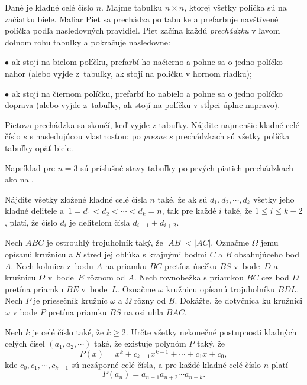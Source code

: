 {%
Dané je kladné celé číslo $n$. Majme tabuľku $n \times n$, ktorej všetky políčka sú na začiatku biele. Maliar Piet sa prechádza po tabuľke a prefarbuje navštívené políčka podľa nasledovných pravidiel. Piet začína každú \emph{prechádzku} v ľavom dolnom rohu tabuľky a pokračuje nasledovne:
\item{$\bullet$} ak stojí na bielom políčku, prefarbí ho načierno a pohne sa o jedno políčko nahor (alebo vyjde z~tabuľky, ak stojí na políčku v hornom riadku);
\item{$\bullet$} ak stojí na čiernom políčku, prefarbí ho nabielo a pohne sa o jedno políčko doprava (alebo vyjde z~tabuľky, ak stojí na políčku v stĺpci úplne napravo).

Pietova prechádzka sa skončí, keď vyjde z tabuľky. Nájdite najmenšie kladné celé číslo $s$ s nasledujúcou vlastnosťou: po \emph{presne} $s$ prechádzkach sú všetky políčka tabuľky opäť biele.

\smallskip\noindent
Napríklad pre $n = 3$ sú príslušné stavy tabuľky po prvých piatich prechádzkach ako na \obr.
%
}

{%
Nájdite všetky zložené kladné celé čísla $n$ také,
že ak sú $d_1, d_2, \cdots, d_k$ všetky jeho kladné delitele
a~$1=d_1<d_2<\cdots<d_k=n$,
tak pre každé $i$ také,
že $1\le i\le k-2$,
platí,
že číslo $d_i$ je deliteľom čísla $d_{i+1}+d_{i+2}$.
}

{%
Nech $ABC$ je ostrouhlý trojuholník taký,
že $|AB|<|AC|$.
Označme $\varOmega$ jemu opísanú kružnicu
a $S$ stred jej oblúka s krajnými bodmi $C$ a $B$ obsahujúceho bod $A$.
Nech kolmica z~bodu $A$ na priamku $BC$ pretína úsečku $BS$ v~bode~$D$
a kružnicu $\varOmega$ v~bode~$E$ rôznom od $A$.
Nech rovnobežka s priamkou $BC$ cez bod $D$ pretína priamku $BE$ v~bode~$L$.
Označme $\omega$ kružnicu opísanú trojuholníku $BDL$.
Nech $P$ je priesečník kružníc $\omega$ a $\varOmega$ rôzny od $B$.
Dokážte,
že dotyčnica ku kružnici $\omega$ v bode $P$ pretína priamku $BS$ na osi uhla $BAC$.
}

{%
Nech $k$ je celé číslo také, že $k\ge2$. Určte všetky nekonečné postupnosti kladných celých čísel $(a_1,a_2,\cdots)$ také, že existuje polynóm $P$ taký, že
$$
P(x)=x^k+c_{k-1}x^{k-1}+\cdots+c_1x+c_0,
$$
kde $c_0, c_1, \cdots, c_{k-1}$ sú nezáporné celé čísla, a pre každé kladné celé číslo $n$ platí
$$
P(a_n)=a_{n+1}a_{n+2}\cdots a_{n+k}.
$$
}

